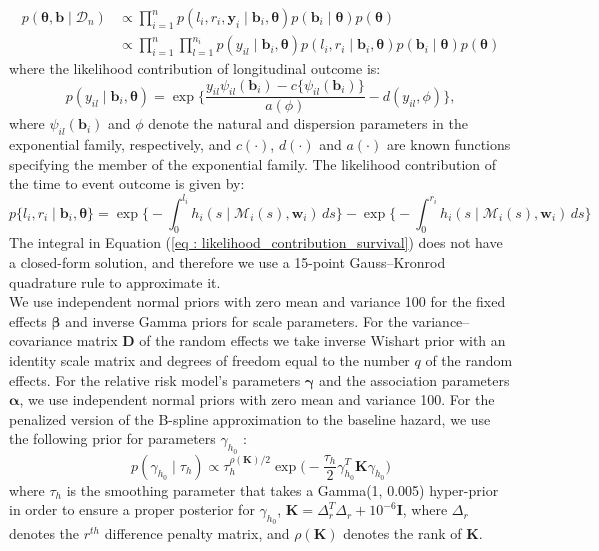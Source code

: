 \begin{align*}
p(\boldsymbol{\theta}, \boldsymbol{b} \mid \mathcal{D}_n) & \propto \prod_{i=1}^n p(l_i, r_i, \boldsymbol{y}_i \mid \boldsymbol{b}_i, \boldsymbol{\theta}) p(\boldsymbol{b}_i \mid \boldsymbol{\theta}) p(\boldsymbol{\theta})\\
& \propto \prod_{i=1}^n  \prod_{l=1}^{n_i} p(y_{il} \mid \boldsymbol{b}_i, \boldsymbol{\theta}) p(l_i, r_i \mid \boldsymbol{b}_i, \boldsymbol{\theta})  p(\boldsymbol{b}_i \mid \boldsymbol{\theta}) p(\boldsymbol{\theta})
\end{align*}
where the likelihood contribution of longitudinal outcome is:
\begin{equation*}
p(y_{il}\mid \boldsymbol{b}_i,\boldsymbol{\theta})=
\exp\Bigg\{\frac{y_{il}\psi_{il}(\boldsymbol{b}_i)-c\{\psi_{il}(\boldsymbol{b}_i)\}}{a(\phi)} -d( y_{il},\phi)         \Bigg\},
\end{equation*}
where $\psi_{il}(\boldsymbol{b}_i)$ and $\phi$ denote the natural and dispersion parameters in the exponential family, respectively, and $c(\cdot)$, $d(\cdot)$ and $a(\cdot)$ are known functions specifying the member of the exponential family. The likelihood contribution of the time to event outcome is given by:
\begin{equation}
\label{eq : likelihood_contribution_survival}
p\{l_i,r_i\mid \boldsymbol{b}_i,\boldsymbol{\theta}\} = \exp\Big\{-\int_0^{l_i} h_i(s \mid \mathcal{M}_i(s), \boldsymbol{w}_i)\,ds\Big\} - \exp\Big\{-\int_0^{r_i}h_i(s \mid \mathcal{M}_i(s), \boldsymbol{w}_i)\,ds\Big\}
\end{equation}
The integral in Equation (\ref{eq : likelihood_contribution_survival}) does not have a closed-form solution, and therefore we use a 15-point Gauss–Kronrod quadrature rule to approximate it.\\

We use independent normal priors with zero mean and variance 100 for the fixed effects $\boldsymbol{\beta}$ and inverse Gamma priors for scale parameters. For the variance–covariance matrix $\boldsymbol{D}$ of the random effects we take inverse Wishart prior with an identity scale matrix and degrees of freedom equal to the number $q$ of the random effects. For the relative risk model's parameters $\boldsymbol{\gamma}$ and the association parameters $\boldsymbol{\alpha}$, we use independent normal priors with zero mean and variance 100. For the penalized version of the B-spline approximation to the baseline hazard, we use the following prior for parameters $\gamma_{h_0}$ \citep{lang2004bayesian}:
\begin{equation*}
p(\gamma_{h_0} \mid \tau_h) \propto \tau_h^{\rho(\boldsymbol{K})/2} \exp\Big(-\frac{\tau_h}{2}\gamma_{h_0}^T \boldsymbol{K} \gamma_{h_0}\Big)
\end{equation*}
where $\tau_h$ is the smoothing parameter that takes a Gamma(1, 0.005) hyper-prior in order to ensure a proper posterior for $\gamma_{h_0}$, $\boldsymbol{K} = \Delta_r^T \Delta_r + 10^{-6} \boldsymbol{I}$, where $\Delta_r$ denotes the $r^{th}$ difference penalty matrix, and $\rho(\boldsymbol{K})$ denotes the rank of $\boldsymbol{K}$.